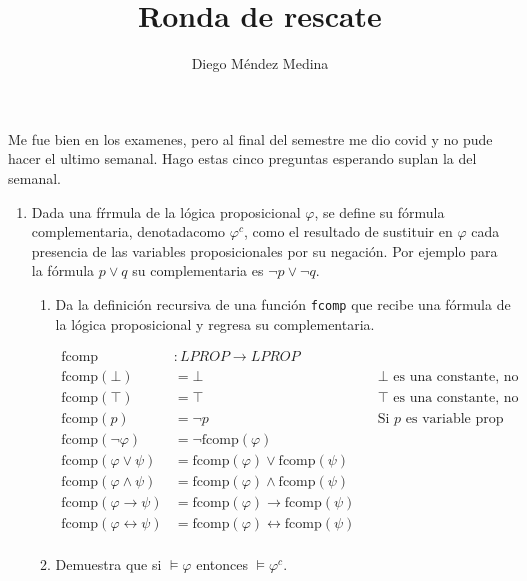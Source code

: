 \documentclass[11pt,letterpaper]{article}
\title{\large{Ronda de rescate}}
\author{Diego Méndez Medina}
\date{}
\begin{document}
\maketitle

Me fue bien en los examenes, pero al final del semestre me dio covid y
no pude hacer el ultimo semanal. Hago estas cinco preguntas esperando
suplan la del semanal.

\begin{enumerate}
\item Dada una fŕrmula de la lógica proposicional $\varphi$, se define
  su fórmula complementaria, denotadacomo $\varphi^c$, como el resultado
  de sustituir en $\varphi$ cada presencia de las variables proposicionales
  por su negación. Por ejemplo para la fórmula $p\lor q$ su complementaria
  es $\neg p \lor \neg q$.
  \begin{enumerate}
  \item Da la definición recursiva de una función \texttt{fcomp} que recibe
    una fórmula de la lógica proposicional y regresa su complementaria.
    \ttfamily

    \begin{align*}
      \text{fcomp} &: LPROP \rightarrow LPROP\\
      \text{fcomp} (\bot) &= \bot
      & &\text{$\bot$ es una constante, no es una variable}\\
      \text{fcomp}(\top) &= \top
      & &\text{$\top$ es una constante, no es una variable}\\
    \text{fcomp} (p) &= \neg p & &\text{Si $p$ es variable prop}\\
    \text{fcomp} (\neg\varphi) &= \neg \text{fcomp}(\varphi)\\
    \text{fcomp} (\varphi\lor\psi) &=
    \text{fcomp}(\varphi)\lor\text{fcomp}(\psi)\\
    \text{fcomp} (\varphi\land\psi) &=
    \text{fcomp}(\varphi)\land\text{fcomp}(\psi)\\
    \text{fcomp} (\varphi\rightarrow\psi) &=
    \text{fcomp}(\varphi)\rightarrow\text{fcomp}(\psi)\\
    \text{fcomp} (\varphi\leftrightarrow\psi) &=
    \text{fcomp}(\varphi)\leftrightarrow\text{fcomp}(\psi)\\
    \end{align*}

    \rmfamily
  \item Demuestra que si $\models \varphi$  entonces $\models \varphi^c$.
  \end{enumerate}


\end{enumerate}
\end{document}
